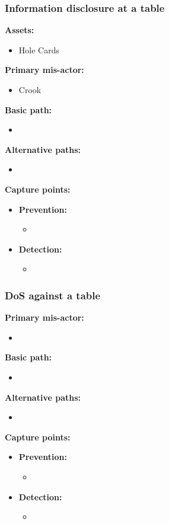 \documentclass[a4paper,11pt]{report}
\begin{document}
\subsubsection{Information disclosure at a table}
\textbf{Assets:}
\begin{itemize}
\item Hole Cards
\end{itemize}
\textbf{Primary mis-actor:}
\begin{itemize}
\item Crook
\end{itemize}
\textbf{Basic path:}
\begin{itemize}
\item 
\end{itemize}
\textbf{Alternative paths:}
\begin{itemize}
\item 
\end{itemize}
\textbf{Capture points:}
\begin{itemize}
\item \textbf{Prevention:}
\begin{itemize}
\item 
\end{itemize}
\item \textbf{Detection:}
\begin{itemize}
\item 
\end{itemize}
\end{itemize}
\subsubsection{DoS against a table}
\textbf{Primary mis-actor:}
\begin{itemize}
\item 
\end{itemize}
\textbf{Basic path:}
\begin{itemize}
\item 
\end{itemize}
\textbf{Alternative paths:}
\begin{itemize}
\item 
\end{itemize}
\textbf{Capture points:}
\begin{itemize}
\item \textbf{Prevention:}
\begin{itemize}
\item 
\end{itemize}
\item \textbf{Detection:}
\begin{itemize}
\item 
\end{itemize}
\end{itemize}
\end{document}
